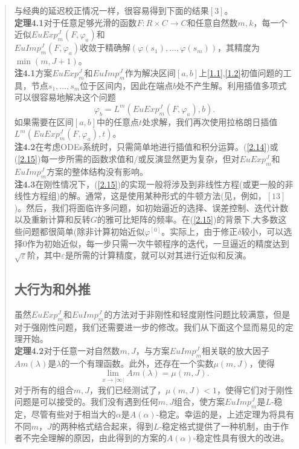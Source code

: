 \documentclass{article}
\begin{document}
\begin{CJK}{UTF8}{gkai}
\begin{quotation}
与经典的延迟校正情况一样，很容易得到下面的结果$[3]$。\\

\textbf{定理4.1}对于任意足够光滑的函数$F:R \times C\rightarrow C$和任意自然数$m,k$，每一个近似$EuExp_{m}^{J}(F,\varphi_a)$和\\$EuImp_{m}^{J}(F,\varphi_a)$收敛于精确解$(\varphi(s_1),\ldots,\varphi(s_m))$，其精度为$\min(m,J+1)$。\\

\textbf{注4.1}方案$EuExp_{m}^{J}$和$EuImp_{m}^{J}$作为解决区间$[a,b]$上\ref{1.1},\ref{1.2}初值问题的工具，节点$s_1,\ldots,s_m$位于区间内，因此在端点$b$处不产生解。利用插值多项式可以很容易地解决这个问题\\
\begin{equation}
\varphi_b=L^m(EuExp_{m}^{J}(F,\varphi_a),b).
\end{equation}
如果需要在区间$[a,b]$中的任意点$t$处求解，我们再次使用拉格朗日插值$L^m(EuExp^{J}_{m}(F,\varphi_a),t)$。\\

\textbf{注4.2}在考虑ODEs系统时，只需简单地进行插值和积分运算。(\ref{2.14})或(\ref{2.15})每一步所需的函数求值和/或反演显然更为复杂，但对$EuExp_{m}^{J}$和$EuImp_{m}^{J}$方案的整体结构没有影响。\\

\textbf{注4.3}在刚性情况下，(\ref{2.15})的实现一般将涉及到非线性方程(或更一般的非线性方程组)的解。通常，这是使用某种形式的牛顿方法(见，例如，$[13]$)。然后，我们将面临许多问题，如初始逼近的选择、误差控制、迭代计数以及重新计算和反转$G$的雅可比矩阵的频率。在(\ref{2.15})的背景下,大多数这些问题都很简单(除非计算初始近似$\varphi^{[0]}$。实际上，由于修正$\delta$较小，可以选择$0$作为初始近似，每一步只需一次牛顿程序的迭代，一旦逼近的精度达到$\sqrt{\varepsilon}$阶，其中$\varepsilon$是所需的计算精度，就可以对其进行近似和反演。\\
\subsection{大行为和外推}

虽然$EuExp_{m}^{J}$和$EuImp_{m}^{J}$的方法对于非刚性和轻度刚性问题比较满意，但是对于强刚性问题，我们还需要进一步的修改。我们从下面这个显而易见的定理开始。\\

\textbf{定理4.2}对于任意一对自然数$m,J$，与方案$EuImp_{m}^{J}$相关联的放大因子$Am(\lambda)$是$\lambda$的一个有理函数。此外，还存在一个实数$\mu(m,J)$，使得\\
\begin{equation}
\lim_{x \to |\infty|} Am(\lambda)= \mu(m,J).
\end{equation}
对于所有的组合$m,J$，我们已经测试了，$\mu(m,J)<1$，使得它们对于刚性问题是可以接受的。我们没有遇到任何$m,J $组合，使方案$EuImp_{m}^{J}$是$L$-稳定，尽管有些对于相当大的$\alpha$是$A(\alpha)$-稳定。幸运的是，上述定理为将具有不同$m，J$的两种格式结合起来，得到$L$-稳定格式提供了一种机制，由于作者不完全理解的原因，由此得到的方案的$A(\alpha)$-稳定性具有很大的改进。\\


\end{quotation}
\end{CJK}
\end{document}
